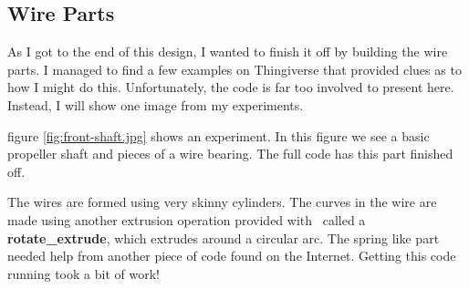 \subsection{Wire Parts}

As I got to the end of this design, I wanted to finish it off by building the
wire parts. I managed to find a few examples on {Thingiverse} that provided
clues as to how I might do this. Unfortunately, the code is far too involved to
present here. Instead, I will show one image from my experiments.


figure \ref{fig:front-shaft.jpg} shows an experiment. In this figure we see a basic
propeller shaft and pieces of a wire bearing. The full code has this part
finished off.

The wires are formed using very skinny cylinders. The curves in the wire are
made using another extrusion operation provided with \osc\ called a {\bf
rotate\_extrude}, which extrudes around a circular arc. The spring like part
needed help from another piece of code found on the Internet. Getting this code
running took a bit of work!
